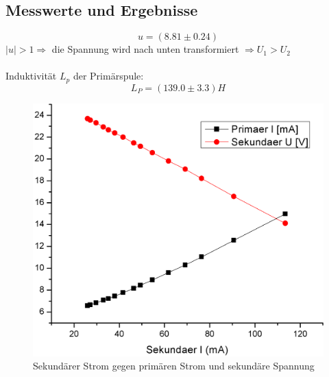 \documentclass[12pt,a4paper]{article}
\begin{document}
\begin{multicols}{2}
\subsection{Messwerte und Ergebnisse}

$$u = (8.81 \pm 0.24)$$
\noindent
$|u| > 1 \Rightarrow$ die Spannung wird nach unten transformiert $\Rightarrow U_1 > U_2$ \\
\\
Induktivität $L_p$ der Primärspule:\\
$$L_P = (139.0 \pm 3.3)H$$

\end{multicols}
\begin{figure}[H]
	\centering
	\includegraphics[scale=0.45]{./figure/transformator_sI_pI_su.png}
	\caption{Sekundärer Strom gegen primären Strom und sekundäre Spannung}
	\label{fig:trafo_si_pi_su}
\end{figure}
\begin{multicols}{2}

\end{multicols}
\end{document}
